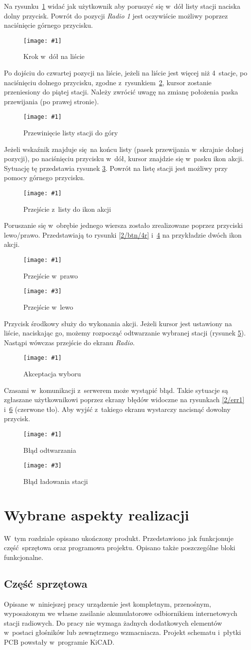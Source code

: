 \documentclass[polish]{aghengthesis}
\newcommand{\imgint}[4]{
	\begin{figure}[{#4}]
		\centering
		\texttt{[image: \#1]}
		\caption{#2}
		\label{#1}
	\end{figure}
}
\newcommand{\imgh}[3]{\imgint{#1}{#2}{#3}{H}}
\newcommand{\imgintss}[5]{
	\begin{figure}[{#5}]
		\centering
		\begin{minipage}{.45\textwidth}
			\centering
			\texttt{[image: \#1]}
			\caption{#2}
			\label{#1}
		\end{minipage}%
		\hfill
		\begin{minipage}{.45\textwidth}
			\centering
			\texttt{[image: \#3]}
			\caption{#4}
			\label{#3}
		\end{minipage}
	\end{figure}
}
\newcommand{\imghss}[4]{\imgintss{#1}{#2}{#3}{#4}{H}}
\begin{document}
		Na rysunku~\ref{2/btn/1} widać jak użytkownik aby poruszyć się w~dół listy stacji naciska dolny przycisk. Powrót do pozycji \textit{Radio 1} jest oczywiście możliwy poprzez naciśnięcie górnego przycisku.
		\imgh{2/btn/1}{Krok w~dół na liście}{0.7}
		
		Po dojściu do czwartej pozycji na liście, jeżeli na liście jest więcej niż 4~stacje, po naciśnięciu dolnego przycisku, zgodne z~rysunkiem~\ref{2/btn/2}, kursor zostanie przeniesiony do piątej stacji. Należy zwrócić uwagę na zmianę położenia paska przewijania (po prawej stronie).
		\imgh{2/btn/2}{Przewinięcie listy stacji do góry}{0.7}
		
		Jeżeli wskaźnik znajduje się na końcu listy (pasek przewijania w~skrajnie dolnej pozycji), po naciśnięciu przycisku w~dół, kursor znajdzie się w~pasku ikon akcji. Sytuację tę przedstawia rysunek \ref{2/btn/3}. Powrót na listę stacji jest możliwy przy pomocy górnego przycisku.
		\imgh{2/btn/3}{Przejście z~listy do ikon akcji}{0.7}
		
		Poruszanie się w~obrębie jednego wiersza zostało zrealizowane poprzez przyciski \mbox{lewo/prawo}. Przedstawiają to rysunki \ref{2/btn/4r} i~\ref{2/btn/4l} na przykładzie dwóch ikon akcji.
		\imghss{2/btn/4r}{Przejście w~prawo}{2/btn/4l}{Przejście w~lewo}
		
		Przycisk środkowy służy do wykonania akcji. Jeżeli kursor jest ustawiony na liście, naciskając go, możemy rozpocząć odtwarzanie wybranej stacji (rysunek \ref{2/btn/5}). Nastąpi wówczas przejście do ekranu \textit{Radio}.
		\imgh{2/btn/5}{Akceptacja wyboru}{0.7}
				
		Czasami w~komunikacji z~serwerem może wystąpić błąd. Takie sytuacje są zgłaszane użytkownikowi poprzez ekrany błędów widoczne na rysunkach \ref{2/err1} i~\ref{2/err2} (czerwone tło). Aby wyjść z~takiego ekranu wystarczy nacisnąć dowolny przycisk.
		\imghss{2/err1}{Błąd odtwarzania}{2/err2}{Błąd ładowania stacji}

\cleardoublepage
\chapter{Wybrane aspekty realizacji}
	W~tym rozdziale opisano ukończony produkt.
	Przedstawiono jak funkcjonuje część sprzętowa oraz programowa projektu. Opisano także poszczególne bloki funkcjonalne.
	
	\section{Część sprzętowa}
		\label{sec:hw}
		Opisane w~niniejszej pracy urządzenie jest kompletnym, przenośnym, wyposażonym we własne zasilanie akumulatorowe  odbiornikiem internetowych stacji radiowych. Do pracy nie wymaga żadnych dodatkowych elementów w~postaci głośników lub zewnętrznego wzmacniacza.
		Projekt schematu i~płytki PCB powstały w~programie KiCAD\textsuperscript{\cite{hw_kicad}}.
	
\end{document}

